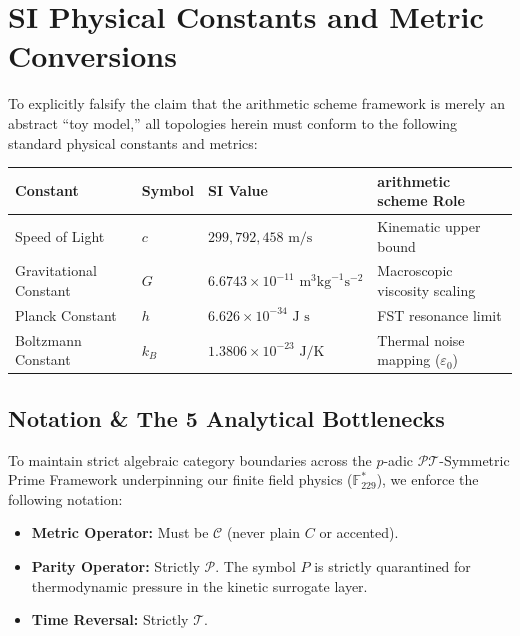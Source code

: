 \section*{SI Physical Constants and Metric Conversions}
To explicitly falsify the claim that the arithmetic scheme framework is merely an abstract ``toy model,'' all topologies herein must conform to the following standard physical constants and metrics:
\begin{table}[ht]
\centering
\renewcommand{\arraystretch}{1.2}
\begin{tabular}{@{}llll@{}}
\toprule
\textbf{Constant} & \textbf{Symbol} & \textbf{SI Value} & \textbf{arithmetic scheme Role} \\
\midrule
Speed of Light & $c$ & $299,792,458 \text{ m/s}$ & Kinematic upper bound \\
Gravitational Constant & $G$ & $6.6743 \times 10^{-11} \text{ m}^3 \text{kg}^{-1} \text{s}^{-2}$ & Macroscopic viscosity scaling \\
Planck Constant & $h$ & $6.626 \times 10^{-34} \text{ J s}$ & FST resonance limit \\
Boltzmann Constant & $k_B$ & $1.3806 \times 10^{-23} \text{ J/K}$ & Thermal noise mapping ($\varepsilon_0$) \\
\bottomrule
\end{tabular}
\end{table}

\subsection*{Notation \& The 5 Analytical Bottlenecks}
To maintain strict algebraic category boundaries across the $p$-adic $\mathcal{PT}$-Symmetric Prime Framework underpinning our finite field physics ($\mathbb{F}_{229}^*$), we enforce the following notation: 
\begin{itemize}
    \item \textbf{Metric Operator:} Must be $\mathcal{C}$ (never plain $C$ or accented).
    \item \textbf{Parity Operator:} Strictly $\mathcal{P}$. The symbol $P$ is strictly quarantined for thermodynamic pressure in the kinetic surrogate layer. 
    \item \textbf{Time Reversal:} Strictly $\mathcal{T}$.
\end{itemize}

